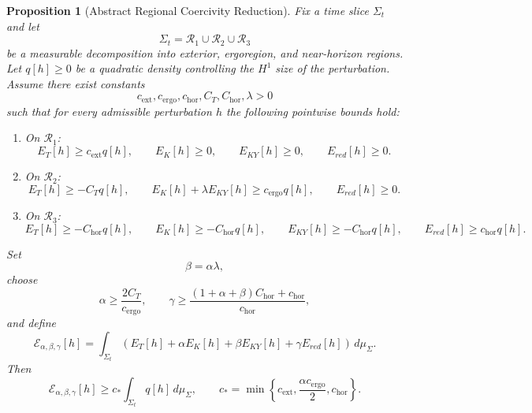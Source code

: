 \documentclass[12pt,a4paper]{article}
\newtheorem{proposition}[theorem]{Proposition}
\begin{document}
\begin{proposition}[Abstract Regional Coercivity Reduction]\label{prop:regional-coercivity}
Fix a time slice $\Sigma_t$ and let
\begin{equation}
\Sigma_t = \mathcal{R}_1 \cup \mathcal{R}_2 \cup \mathcal{R}_3
\end{equation}
be a measurable decomposition into exterior, ergoregion, and near-horizon regions. Let $q[h]\ge 0$ be a quadratic density controlling the $H^1$ size of the perturbation. Assume there exist constants
\begin{equation}
c_{\mathrm{ext}}, c_{\mathrm{ergo}}, c_{\mathrm{hor}}, C_T, C_{\mathrm{hor}}, \lambda > 0
\end{equation}
such that for every admissible perturbation $h$ the following pointwise bounds hold:
\begin{enumerate}
    \item On $\mathcal{R}_1$:
    \begin{equation}
    E_T[h] \ge c_{\mathrm{ext}} q[h], \qquad E_K[h] \ge 0, \qquad E_{KY}[h] \ge 0, \qquad E_{red}[h] \ge 0.
    \end{equation}
    \item On $\mathcal{R}_2$:
    \begin{equation}
    E_T[h] \ge -C_T q[h], \qquad E_K[h] + \lambda E_{KY}[h] \ge c_{\mathrm{ergo}} q[h], \qquad E_{red}[h] \ge 0.
    \end{equation}
    \item On $\mathcal{R}_3$:
    \begin{equation}
    E_T[h] \ge -C_{\mathrm{hor}} q[h], \qquad E_K[h] \ge -C_{\mathrm{hor}} q[h], \qquad E_{KY}[h] \ge -C_{\mathrm{hor}} q[h], \qquad E_{red}[h] \ge c_{\mathrm{hor}} q[h].
    \end{equation}
\end{enumerate}
Set
\begin{equation}
\beta = \alpha \lambda,
\end{equation}
choose
\begin{equation}
\alpha \ge \frac{2C_T}{c_{\mathrm{ergo}}},
\qquad
\gamma \ge \frac{(1+\alpha+\beta)C_{\mathrm{hor}} + c_{\mathrm{hor}}}{c_{\mathrm{hor}}},
\end{equation}
and define
\begin{equation}
\mathcal{E}_{\alpha,\beta,\gamma}[h] = \int_{\Sigma_t}\left(E_T[h] + \alpha E_K[h] + \beta E_{KY}[h] + \gamma E_{red}[h]\right)\,d\mu_{\Sigma}.
\end{equation}
Then
\begin{equation}
\mathcal{E}_{\alpha,\beta,\gamma}[h]
\ge
c_* \int_{\Sigma_t} q[h]\,d\mu_{\Sigma},
\qquad
c_* = \min\left\{c_{\mathrm{ext}}, \frac{\alpha c_{\mathrm{ergo}}}{2}, c_{\mathrm{hor}}\right\}.
\end{equation}
\end{proposition}
\end{document}

